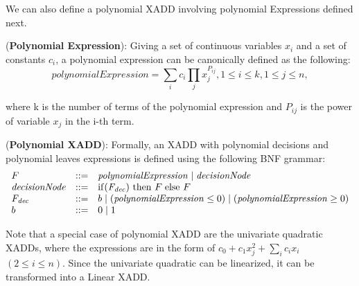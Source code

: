 \documentclass[twoside,11pt]{article}
\newenvironment{mydef}[1][Definition]{\begin{trivlist}
\item[\hskip \labelsep {\bfseries #1}]}{\end{trivlist}}
\begin{document}
We can also define a polynomial XADD involving polynomial Expressions defined next.

\begin{mydef}(\textbf{Polynomial Expression}):
Giving a set of continuous variables $x_i$ and a set of constants $c_i$, a polynomial  expression can be canonically defined  as the following:
\begin{equation}
\mathit{polynomialExpression} = \sum_{i} c_i \prod_{j} x_j^{P_{ij}}, 1 \leq i \leq k, 1 \leq j \leq n, 
\label{Eq:canonicalpoly}
\end{equation}
\end{mydef}

where k is the number of terms of the polynomial expression and $P_{ij}$ is the power of variable $x_j$ in the i-th term. 

\begin{mydef}(\textbf{Polynomial XADD}):
Formally, an XADD with polynomial decisions and polynomial leaves expressions is defined using the following BNF grammar: 
\begin{equation}
\nonumber
\begin{array}{lll}
F&::=&  \mathit{polynomialExpression}  \hspace{1mm} \vert \hspace{1mm}   \mathit{decisionNode}\\
\mathit{decisionNode} &::=& \mathrm{if} (\mathit{F_{dec}})\ \mathrm{then}\ F \hspace{1mm} \mathrm{else}\ F \\ 
\mathit{F_{dec}} &::=& b \hspace{1mm}  \vert \hspace{1mm}  ( \mathit{polynomialExpression} \leq 0)  \hspace{1mm}\vert \hspace{1mm}
 ( \mathit{polynomialExpression} \geq 0)   
\\
b&::=& 0\hspace{1mm} |\hspace{1mm} 1
\end{array}
\end{equation}
\end{mydef}

Note that a special case of polynomial XADD are the univariate quadratic XADDs, where the expressions are 
in the form of $c_0+ c_1 x_j^2 + \sum_{i} c_i x_i$  $(2 \leq i \leq n)$. Since the univariate quadratic can be linearized, it can be transformed into a Linear XADD.
\end{document}
